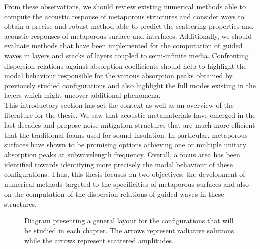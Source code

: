 From these observations, we should review existing numerical methods able to compute the acoustic response of metaporous structures and consider ways to obtain a precise and robust method able to predict the scattering properties and acoustic responses of metaporous surface and interfaces. Additionally, we should evaluate methods that have been implemented for the computation of guided waves in layers and stacks of layers coupled to semi-infinite media. Confronting dispersion relations against absorption coefficients should help to highlight the modal behaviour responsible for the various absorption peaks obtained by previously studied configurations and also highlight the full modes existing in the layers which might uncover additional phenomena. \\[1em]

This introductory section has set the context as well as an overview of the literature for the thesis. We saw that acoustic metamaterials have emerged in the last decades and propose noise mitigation structures that are much more efficient that the traditional foams used for sound insulation. In particular, metaporous surfaces have shown to be promising options achieving one or multiple unitary absorption peaks at subwavelength frequency. Overall, a focus area has been identified towards identifying more precisely the modal behaviour of these configurations. Thus, this thesis focuses on two objectives: the development of numerical methods targeted to the specificities of metaporous surfaces and also on the computation of the dispersion relations of guided waves in these structures. 

\begin{figure}[htpb]
    \centering
    
    \caption{Diagram presenting a general layout for the configurations that will be studied in each chapter. The \squigglyarrowlegend arrows represent radiative solutions while the \straightarrowlegend arrows represent scattered amplitudes.}
    \label{fig:intro_diagram}
\end{figure}

